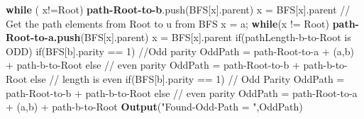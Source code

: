 \documentclass{article}
\begin{document}
  \hspace*{1.0cm}	\textbf {while} ( x!=Root) \newline
  \hspace*{1.5cm}		\textbf {path-Root-to-b}.push(BFS[x].parent) \newline
  \hspace*{1.5cm}		x = BFS[x].parent \newline
  \hspace*{1.0cm}	// Get the path elements from Root to u from BFS \newline
  \hspace*{1.0cm}	x = a; \newline
  \hspace*{1.0cm}	\textbf {while}(x != Root) \newline
  \hspace*{1.5cm}		\textbf {path-Root-to-a.push}(BFS[x].parent) \newline
  \hspace*{1.5cm}		x = BFS[x].parent \newline
  \newline
  \hspace*{1.0cm}	if(pathLength-b-to-Root is ODD) \newline
  \hspace*{1.5cm}		if(BFS[b].parity == 1) //Odd parity \newline
  \hspace*{2.0cm}			OddPath = path-Root-to-a + (a,b) + path-b-to-Root \newline
  \hspace*{1.5cm}		else // even parity \newline
  \hspace*{2.0cm}			OddPath = path-Root-to-b + path-b-to-Root \newline
  \hspace*{1.0cm}	else // length is even \newline
  \hspace*{1.5cm}		if(BFS[b].parity == 1) // Odd Parity \newline
  \hspace*{2.0cm}			OddPath = path-Root-to-b + path-b-to-Root \newline
  \hspace*{1.5cm}		else // even parity \newline
  \hspace*{2.0cm}			OddPath = path-Root-to-a + (a,b) + path-b-to-Root \newline
  \hspace*{1.0cm}       \textbf {Output}("Found-Odd-Path = ",OddPath) \newline
\end{document}
